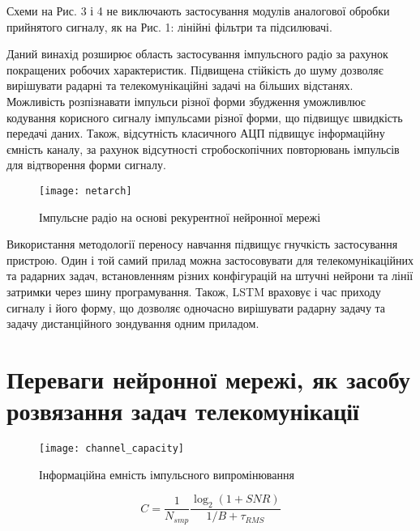 Схеми на Рис. 3 і 4 не виключають застосування модулів аналогової 
обробки прийнятого сигналу, як на Рис. 1: лінійні фільтри 
та підсилювачі.

Даний винахід розширює область застосування імпульсного радіо за 
рахунок покращених робочих характеристик. Підвищена стійкість до 
шуму дозволяє вирішувати радарні та телекомунікаційні задачі на 
більших відстанях. Можливість розпізнавати імпульси різної форми 
збудження уможливлює кодування корисного сигналу імпульсами різної форми, 
що підвищує швидкість передачі даних. Також, відсутність класичного АЦП 
підвищує інформаційну ємність каналу, за рахунок відсутності 
стробоскопічних повторювань імпульсів для відтворення форми сигналу.

\begin{figure}[htbp] \begin{center}
\texttt{[image: netarch]}
\caption{Імпульсне радіо на основі рекурентної нейронної мережі} 
\label{fig:rnn_radio}
\end{center} \end{figure}

Використання методології переносу навчання підвищує гнучкість 
застосування пристрою. Один і той самий прилад можна застосовувати для 
телекомунікаційних та радарних задач, встановленням різних 
конфігурацій на штучні нейрони та лінії затримки через шину 
програмування. Також, LSTM враховує і час приходу сигналу і його форму, 
що дозволяє одночасно вирішувати радарну задачу та задачу дистанційного 
зондування одним приладом.

\section{Переваги нейронної мережі, як засобу розвязання задач телекомунікації}

\begin{figure}[htbp] \begin{center}
\texttt{[image: channel\_capacity]}
\caption{Інформаційна емність імпульсного випромінювання} \label{fig:info_cap}
\end{center} \end{figure}

\begin{equation}
C = \frac{1}{N_{smp}} \frac{\log_2 \left( 1 + SNR \right)}{1/B + \tau_{RMS}} 
\end{equation}

